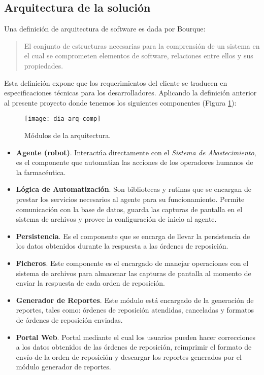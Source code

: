 \subsection{Arquitectura de la solución}
Una definición de arquitectura de software es dada por Bourque\cite{SWEBOOK}:
\begin{quote}
El conjunto de estructuras necesarias para la comprensión de un sistema en el cual se comprometen elementos de software, relaciones entre ellos y sus propiedades.
\end{quote}
Esta definición expone que los requerimientos del cliente se traducen en especificaciones técnicas para los desarrolladores. Aplicando la definición anterior al presente proyecto donde tenemos los siguientes componentes (Figura \ref{fig:dia-arq-comp}):
\begin{figure}[h]
\centering
\texttt{[image: dia-arq-comp]} 
\caption{Módulos de la arquitectura.}
\label{fig:dia-arq-comp}
\end{figure}
\pagebreak
\begin{itemize}
\item \textbf{Agente (robot)}. Interactúa directamente con el \textit{Sistema de Abastecimiento}, es el componente que automatiza las acciones de los operadores humanos de la farmacéutica.
\item \textbf{Lógica de Automatización}. Son bibliotecas y rutinas que se encargan de prestar los servicios necesarios al agente para su funcionamiento. Permite comunicación con la base de datos, guarda las capturas de pantalla en el sistema de archivos y provee la configuración de inicio al agente.
\item \textbf{Persistencia}. Es el componente que se encarga de llevar la persistencia de los datos obtenidos durante la respuesta a las órdenes de reposición.
\item \textbf{Ficheros}. Este componente es el encargado de manejar operaciones con el sistema de archivos para almacenar las capturas de pantalla al momento de enviar la respuesta de cada orden de reposición.
\item \textbf{Generador de Reportes}. Este módulo está encargado de la generación de reportes, tales como: órdenes de reposición atendidas, canceladas y formatos de órdenes de reposición enviadas.
\item \textbf{Portal Web}. Portal mediante el cual los usuarios pueden hacer correcciones a los datos obtenidos de las órdenes de reposición, reimprimir el formato de envío de la orden de reposición  y descargar los reportes generados por el módulo generador de reportes.
\end{itemize}
\pagebreak
